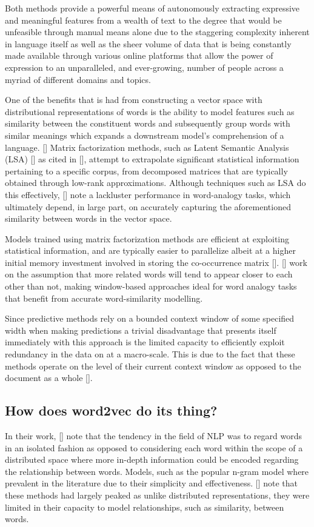 \documentclass[12pt, a4paper]{report}
\theoremstyle{definition}
\theoremstyle{definition}%
\theoremstyle{definition}%
\theoremstyle{definition}%
\theoremstyle{definition}%
\theoremstyle{definition}%
\renewcommand{\cite}[1]{[\citealp{#1}]}
\begin{document}
Both methods provide a powerful means of autonomously extracting expressive and meaningful features from a wealth of text to the degree that would be unfeasible through manual means alone due to the staggering complexity inherent in language itself as well as the sheer volume of data that is being constantly made available through various online platforms that allow the power of expression to an unparalleled, and ever-growing, number of people across a myriad of different domains and topics.  

One of the benefits that is had from constructing a vector space with distributional representations of words is the ability to model features such as similarity between the constituent words and subsequently group words with similar meanings which expands a downstream model's comprehension of a language. \cite{mikolov2013b} Matrix factorization methods, such as Latent Semantic Analysis (LSA) \cite{deerwester1990} as cited in \cite{pennington}, attempt to extrapolate significant statistical information pertaining to a specific corpus, from decomposed matrices that are typically obtained through low-rank approximations. Although techniques such as LSA do this effectively, \cite{pennington} note a lackluster performance in word-analogy tasks, which ultimately depend, in large part, on accurately capturing the aforementioned similarity between words in the vector space. 

Models trained using matrix factorization methods are efficient at exploiting statistical information, and are typically easier to parallelize albeit at a higher initial memory investment involved in storing the co-occurrence matrix \cite{pennington}. \cite{mikolov2013} work on the assumption that more related words will tend to appear closer to each other than not, making window-based approaches ideal for word analogy tasks that benefit from accurate word-similarity modelling.

Since predictive methods rely on a bounded context window of some specified width when making predictions a trivial disadvantage that presents itself immediately with this approach is the limited capacity to efficiently exploit redundancy in the data on at a macro-scale. This is due to the fact that these methods operate on the level of their current context window as opposed to the document as a whole \cite{pennington}.

\subsection{How does word2vec do its thing?}
In their work, \cite{mikolov2013} note that the tendency in the field of NLP was to regard words in an isolated fashion as opposed to considering each word within the scope of a distributed space where more in-depth information could be encoded regarding the relationship between words. Models, such as the popular n-gram model where prevalent in the literature due to their simplicity and effectiveness. \cite{mikolov2013b} note that these methods had largely peaked as unlike distributed representations, they were limited in their capacity to model relationships, such as similarity, between words. 
\end{document}
